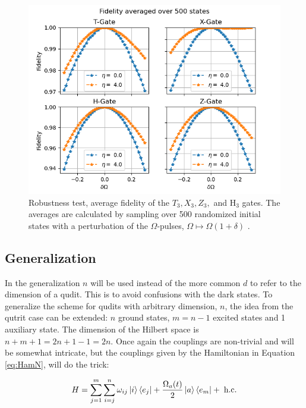 \begin{figure}[H]
\includegraphics[scale=1]{figures/Fid500.png}

\caption{Robustness test, average fidelity of the $T_3,X_3,Z_3,$ and H$_3$ gates. The averages are calculated by sampling over 500 randomized initial states with a perturbation of the $\Omega$-pulses, $\Omega \mapsto \Omega(1+\delta)$ .}
\label{fig:fidelity}
\end{figure}

\newpage
\subsection{Generalization}
In the generalization $n$ will be used instead of the more common $d$ to refer to the dimension of a qudit. This is to avoid confusions with the dark states. To generalize the scheme for qudits with arbitrary dimension, $n$, the idea from the qutrit case can be extended: $n$ ground states, $m = n - 1$ excited states and 1 auxiliary state. The dimension of the Hilbert space is  $n + m + 1 = 2n + 1 -1 = 2n$. Once again the couplings are non-trivial and will be somewhat intricate, but the couplings given by the Hamiltonian in Equation \ref{eq:HamN}, will do the trick:

\begin{equation}
H = \sum_{j = 1}^m \sum_{i = j}^n \omega_{ij} \ket{i}\bra{e_j} + \frac{\Omega_a(t)}{2}\ket{a}\bra{e_m} +\;\text{h.c}.
\label{eq:HamN}
\end{equation}

